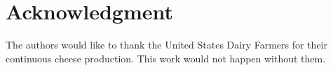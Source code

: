 \documentclass[journal,onecolumn]{IEEEtran}
\begin{document}


\justifying
\section*{Acknowledgment}


	{The authors would like to thank the United States Dairy Farmers for their continuous cheese production. This work would not happen without them.}


\ifCLASSOPTIONcaptionsoff
\newpage
\fi





%
%
%


	  
	 





\end{document}
